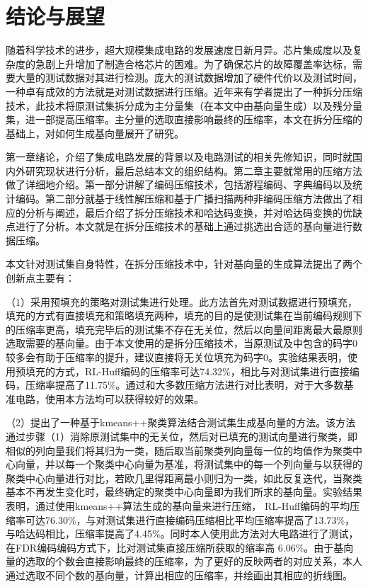 
\chapter*{结论与展望}
随着科学技术的进步，超大规模集成电路的发展速度日新月异。芯片集成度以及复杂度的急剧上升增加了制造合格芯片的困难。为了确保芯片的故障覆盖率达标，需要大量的测试数据对其进行检测。庞大的测试数据增加了硬件代价以及测试时间，一种卓有成效的方法就是对测试数据进行压缩。近年来有学者提出了一种拆分压缩技术，此技术将原测试集拆分成为主分量集（在本文中由基向量生成）以及残分量集，进一部提高压缩率。主分量的选取直接影响最终的压缩率，本文在拆分压缩的基础上，对如何生成基向量展开了研究。

第一章绪论，介绍了集成电路发展的背景以及电路测试的相关先修知识，同时就国内外研究现状进行分析，最后总结本文的组织结构。第二章主要就常用的压缩方法做了详细地介绍。第一部分讲解了编码压缩技术，包括游程编码、字典编码以及统计编码。第二部分就基于线性解压缩和基于广播扫描两种非编码压缩方法做出了相应的分析与阐述，最后介绍了拆分压缩技术和哈达码变换，并对哈达码变换的优缺点进行了分析。本文就是在拆分压缩技术的基础上通过挑选出合适的基向量进行数据压缩。

本文针对测试集自身特性，在拆分压缩技术中，针对基向量的生成算法提出了两个创新点主要有：

（1）采用预填充的策略对测试集进行处理。此方法首先对测试数据进行预填充，填充的方式有直接填充和策略填充两种，填充的目的是使测试集在当前编码规则下的压缩率更高，填充完毕后的测试集不存在无关位，然后以向量间距离最大最原则选取需要的基向量。由于本文使用的是拆分压缩技术，当原测试及中包含的码字0较多会有助于压缩率的提升，建议直接将无关位填充为码字0。实验结果表明，使用预填充的方式，RL-Huff编码的压缩率可达74.32\%，相比与对测试集进行直接编码，压缩率提高了11.75\%。通过和大多数压缩方法进行对比表明，对于大多数基准电路，使用本方法均可以获得较好的效果。

（2）提出了一种基于kmeans++聚类算法结合测试集生成基向量的方法。该方法通过步骤（1）消除原测试集中的无关位，然后对已填充的测试向量进行聚类，即相似的列向量我们将其归为一类，随后取当前聚类列向量每一位的均值作为聚类中心向量，并以每一个聚类中心向量为基准，将测试集中的每一个列向量与以获得的聚类中心向量进行对比，若欧几里得距离最小则归为一类，如此反复迭代，当聚类基本不再发生变化时，最终确定的聚类中心向量即为我们所求的基向量。实验结果表明，通过使用kmeans++算法生成的基向量来进行压缩， RL-Huff编码的平均压缩率可达76.30\%，与对测试集进行直接编码压缩相比平均压缩率提高了13.73\%，与哈达码相比，压缩率提高了4.45\%。同时本人使用此方法对大电路进行了测试，在FDR编码编码方式下，比对测试集直接压缩所获取的缩率高 6.06\%。由于基向量的选取的个数会直接影响最终的压缩率，为了更好的反映两者的对应关系，本人通过选取不同个数的基向量，计算出相应的压缩率，并绘画出其相应的折线图。


